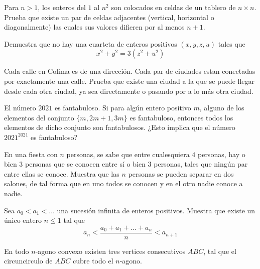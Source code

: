 \documentclass[11pt]{scrartcl}
\newcommand{\thmdifficulty}{0}
\newcommand{\problemdiff}[1]{\renewcommand{\thmdifficulty}{#1}}
\begin{document}
\problemdiff{4}
\begin{problema}
    Para $n>1$, los enteros del $1$ al $n^2$ son colocados en celdas de un tablero de $n\times n$. Prueba que existe un par de celdas adjacentes (vertical, horizontal o diagonalmente) las cuales sus valores difieren por al menos $n+1$.
\end{problema}

\problemdiff{4}
\begin{problema}
    Demuestra que no hay una cuarteta de enteros positivos $(x,y,z,u)$ tales que \[x^2+y^2=3(z^2+u^2)\]
\end{problema}



\problemdiff{4}
\begin{problema}
    Cada calle en Colima es de una dirección. Cada par de ciudades estan conectadas por exactamente una calle. Prueba que existe una ciudad a la que se puede llegar desde cada otra ciudad, ya sea directamente o pasando por a lo más otra ciudad.
\end{problema}

\problemdiff{5}
\begin{problema}  [EGMO 2021/1]
    
    El número $2021$ es fantabuloso. Si para algún entero positivo $m$, alguno de los elementos del conjunto $\{m, 2m + 1, 3m\}$ es fantabuloso, entonces todos los elementos de dicho conjunto
son fantabulosos. ¿Esto implica que el número $2021^{2021}$ es fantabuloso?
\end{problema}


\problemdiff{5}%
\begin{problema}
    En una fiesta con $n$ personas, se sabe que entre cualesquiera $4$ personas, hay o bien $3$
personas que se conocen entre sí o bien $3$ personas, tales que ningún par entre ellas se conoce.
Muestra que las $n$ personas se pueden separar en dos salones, de tal forma que en uno todos
se conocen y en el otro nadie conoce a nadie.
\end{problema}

\problemdiff{5}
\begin{problema}
    Sea $a_0 < a_1 <\ldots$  una sucesión infinita de enteros positivos. Muestra que existe un único entero $n \leq 1$ tal que 
    \[a_n < \frac{a_0+a_1+\ldots+a_n}{n} < a_{n+1}\]
\end{problema}

\problemdiff{5}
\begin{problema}
    En todo $n$-agono convexo existen tres vertices consecutivos $ABC$, tal que el circuncirculo de $ABC$ cubre todo el $n$-agono.
\end{problema}
\end{document}
